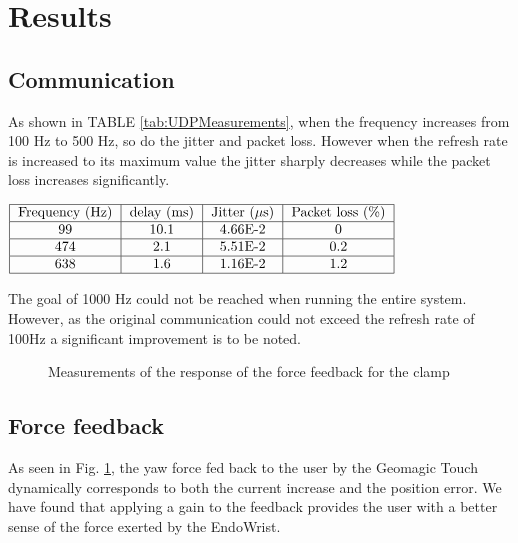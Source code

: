 \section{Results}

\subsection{Communication}

As shown in TABLE \ref{tab:UDPMeasurements}, when the frequency increases from 100 Hz to 500 Hz, so do the jitter and packet loss. However when the refresh rate is increased to its maximum value the jitter sharply decreases while the packet loss increases significantly.

\begin{center}
  $\begin{tabular}{|c|c|c|c|c|c|}
    \hline
    \text{Frequency (Hz)} & \text{delay (ms)} & \text{Jitter ($\mu$s)} & \text{Packet loss (\%)}\\
    \hline
    99 & 10.1 & 4.66E-2 & 0 \\
    \hline
    474 & 2.1 & 5.51E-2 & 0.2 \\
    \hline
    638 & 1.6 & 1.16E-2 & 1.2 \\
    \hline
  \end{tabular}$
  \label{tab:UDPMeasurements}
\end{center}
The goal of 1000 Hz could not be reached when running the entire system. However, as the original communication could not exceed the refresh rate of 100Hz a significant improvement is to be noted.

\begin{figure}[h]
  
  \caption{Measurements of the response of the force feedback for the clamp}
  \label{fbkm}
\end{figure}


\subsection{Force feedback}
As seen in Fig. \ref{fbkm}, the yaw force fed back to the user by the Geomagic Touch dynamically corresponds to both the current increase and the position error.
We have found that applying a gain to the feedback provides the user with a better sense of the force exerted by the EndoWrist.




